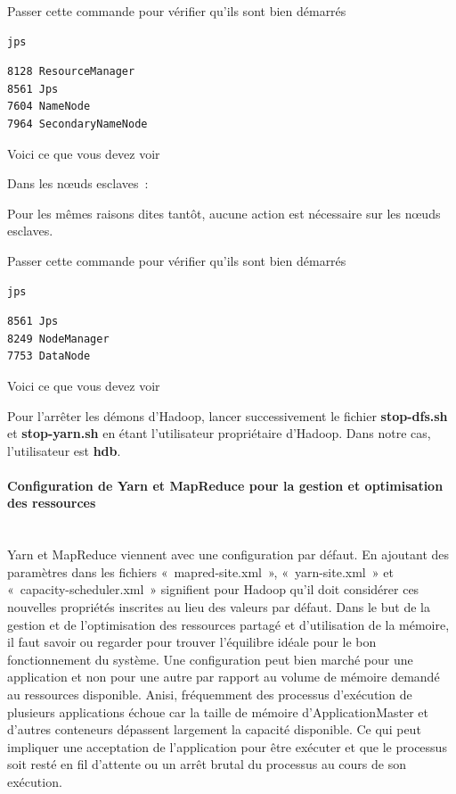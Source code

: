 \documentclass[12pt,french]{book}
\begin{document}
Passer cette commande pour vérifier qu’ils sont bien démarrés 

\begin{lstlisting}[language=bash, frame=single]
jps
\end{lstlisting}

\begin{lstlisting}[language=bash, frame=single]
8128 ResourceManager
8561 Jps
7604 NameNode
7964 SecondaryNameNode
\end{lstlisting}

Voici ce que vous devez voir 

Dans les nœuds esclaves : 

Pour les mêmes raisons dites tantôt, aucune action est nécessaire sur les nœuds esclaves.

Passer cette commande pour vérifier qu’ils sont bien démarrés 

\begin{lstlisting}[language=bash, frame=single]
jps
\end{lstlisting}

\begin{lstlisting}[language=bash, frame=single]
8561 Jps
8249 NodeManager
7753 DataNode
\end{lstlisting}

Voici ce que vous devez voir 

Pour l’arrêter les démons d’Hadoop, lancer successivement le fichier \textbf{stop-dfs.sh} et \textbf{stop-yarn.sh} en étant l’utilisateur propriétaire d’Hadoop. Dans notre cas, l’utilisateur est \textbf{hdb}.

\paragraph{Configuration de Yarn et MapReduce pour la gestion et optimisation des ressources}\mbox{}\\

Yarn et MapReduce viennent avec une configuration par défaut. 
En ajoutant des paramètres dans les fichiers « mapred-site.xml », « yarn-site.xml » et « capacity-scheduler.xml » signifient pour Hadoop qu’il doit considérer ces nouvelles propriétés inscrites au lieu des valeurs par défaut.
Dans le but de la gestion et de l’optimisation des ressources partagé et d’utilisation de la mémoire, il faut savoir ou regarder pour trouver l’équilibre idéale pour le bon fonctionnement du système.
Une configuration peut bien marché pour une application et non pour une autre par rapport au volume de mémoire demandé au ressources disponible.
Anisi, fréquemment des processus d'exécution de plusieurs applications échoue car la taille de mémoire d'ApplicationMaster et d'autres conteneurs dépassent largement la capacité disponible.
Ce qui peut impliquer une acceptation de l’application pour être exécuter et que le processus soit resté en fil d’attente ou un arrêt brutal du processus au cours de son exécution.
\end{document}
